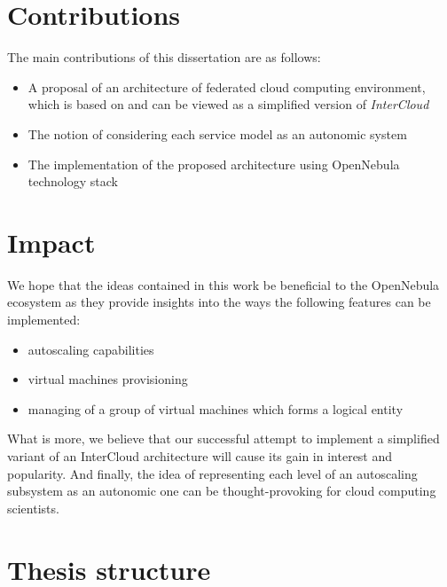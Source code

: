 \section{Contributions}
The main contributions of this dissertation are as follows:
\begin{itemize}
  \item A proposal of an architecture of federated cloud computing environment, which is based on and can be viewed as a simplified version of \emph{InterCloud}
  \item The notion of considering each service model as an autonomic system
  \item The implementation of the proposed architecture using OpenNebula technology stack
\end{itemize}

\section{Impact}
We hope that the ideas contained in this work be beneficial to the OpenNebula ecosystem as they provide insights into the ways the following features can be implemented:
\begin{itemize}
  \item autoscaling capabilities
  \item virtual machines provisioning
  \item managing of a group of virtual machines which forms a logical entity
\end{itemize}
What is more, we believe that our successful attempt to implement a simplified variant of an InterCloud architecture will cause its gain in interest and popularity. And finally, the idea of representing each level of an autoscaling subsystem as an autonomic one can be thought-provoking for cloud computing scientists.
\section{Thesis structure}
